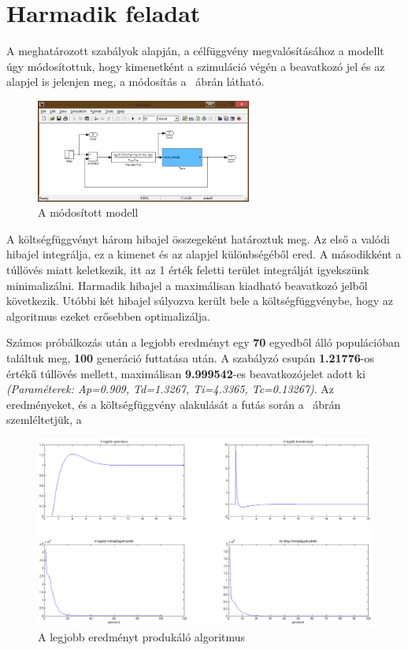 \newpage
\section{Harmadik feladat}
A meghatározott szabályok alapján, a célfüggvény megvalósításához a modellt úgy módosítottuk, hogy kimenetként a szimuláció végén a beavatkozó jel és az alapjel is jelenjen meg, a módosítás a ~ábrán látható.
\begin{figure}[!h]
	\centering
	\includegraphics[width=71mm, keepaspectratio]{figures/m02/cntrl.png}
	\caption{A módosított modell} 
	\label{fig:Control}
\end{figure}
A költségfüggvényt három hibajel összegeként határoztuk meg. Az első a valódi hibajel integrálja, ez a kimenet és az alapjel különbségéből ered. A másodikként a túllövés miatt keletkezik, itt az 1 érték feletti terület integrálját igyekszünk minimalizálni. Harmadik hibajel a maximálisan kiadható beavatkozó jelből következik. Utóbbi két hibajel súlyozva került bele a költségfüggvénybe, hogy az algoritmus ezeket erősebben optimalizálja.

Számos próbálkozás után a legjobb eredményt egy \textbf{70} egyedből álló populációban találtuk meg, \textbf{100} generáció futtatása után. A szabályzó csupán \textbf{1.21776}-os értékű túllövés mellett, maximálisan \textbf{9.999542}-es beavatkozójelet adott ki \textit{(Paraméterek: Ap=0.909, Td=1.3267, Ti=4.3365, Tc=0.13267)}. Az eredményeket, és a költségfüggvény alakulását a futás során a ~ábrán szemléltetjük, a 
\begin{figure}[!h]
	\centering
	\includegraphics[width=151mm, keepaspectratio]{figures/m02/pid2.png}
	\caption{A legjobb eredményt produkáló algoritmus} 
	\label{fig:PID}
\end{figure}
\newpage
\label{PidFctn}

